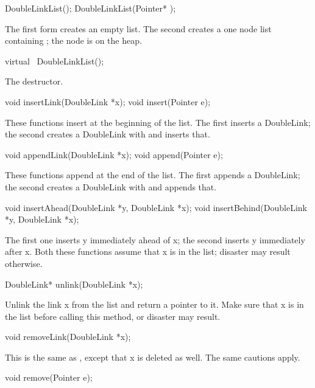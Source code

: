 \begin{example}
DoubleLinkList();
DoubleLinkList(Pointer* );
\end{example}

The first form creates an empty list.  The second creates a one
node list containing ; the node is on the heap.

\begin{example}
virtual ~DoubleLinkList();
\end{example}

The destructor.

\begin{example}
void insertLink(DoubleLink *x);
void insert(Pointer e);
\end{example}

These functions insert at the beginning of the list.  The first inserts
a DoubleLink; the second creates a DoubleLink with 
and inserts that.

\begin{example}
void appendLink(DoubleLink *x);
void append(Pointer e);
\end{example}

These functions append at the end of the list.  The first appends
a DoubleLink; the second creates a DoubleLink with 
and appends that.

\begin{example}
void insertAhead(DoubleLink *y, DoubleLink *x);
void insertBehind(DoubleLink *y, DoubleLink *x);
\end{example}

The first one inserts y immediately ahead of x; the second
inserts y immediately after x.  Both these functions assume
that x is in the list; disaster may result otherwise.

\begin{example}
DoubleLink* unlink(DoubleLink *x);
\end{example}

Unlink the link x from the list and return a pointer to it.
Make sure that x is in the list before calling this method,
or disaster may result.

\begin{example}
void removeLink(DoubleLink *x);
\end{example}

This is the same as , except that x is deleted
as well.  The same cautions apply.

\begin{example}
void remove(Pointer e);
\end{example}


